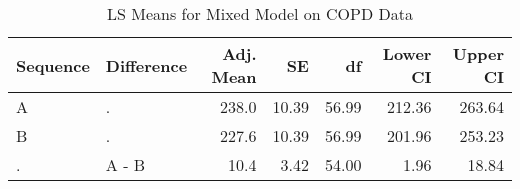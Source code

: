 \begin{table}

\caption{LS Means for Mixed Model on COPD Data}
\centering
\begin{tabular}[t]{l>{}l|rrrrr}
\toprule
Sequence & Difference & Adj. Mean & SE & df & Lower CI & Upper CI\\
\midrule
A & . & 238.0 & 10.39 & 56.99 & 212.36 & 263.64\\
B & . & 227.6 & 10.39 & 56.99 & 201.96 & 253.23\\
. & A - B & 10.4 & 3.42 & 54.00 & 1.96 & 18.84\\
\bottomrule
\end{tabular}
\end{table}
